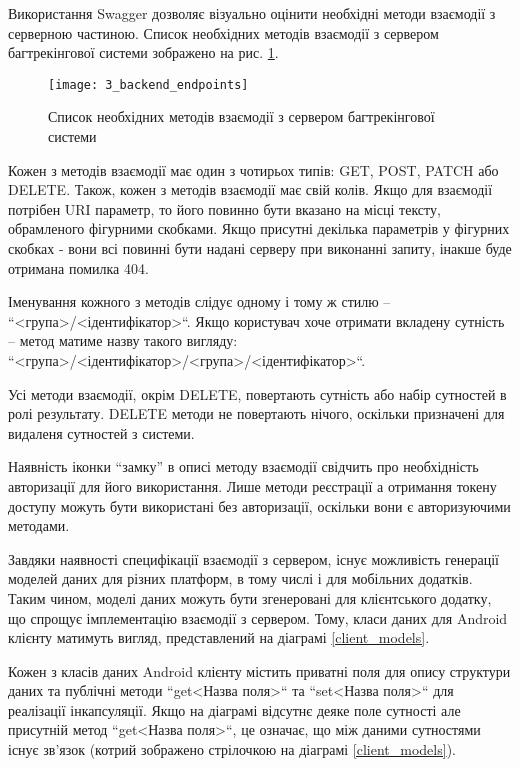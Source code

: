 \documentclass[../main.tex]{subfiles}
\begin{document}
		Використання Swagger дозволяє візуально оцінити необхідні методи взаємодії з серверною частиною. Список необхідних методів взаємодії з сервером багтрекінгової системи зображено на рис. \ref{available_rest_endpoints}.

		\begin{figure}[H]
			\centering
			\texttt{[image: 3\_backend\_endpoints]}
			\caption{Список необхідних методів взаємодії з сервером багтрекінгової системи}
			\label{available_rest_endpoints}
		\end{figure}

		Кожен з методів взаємодії має один з чотирьох типів: GET, POST, PATCH або DELETE. Також, кожен з методів взаємодії має свій колів. Якщо для взаємодії потрібен URI параметр, то його повинно бути вказано на місці тексту, обрамленого фігурними скобками. Якщо присутні декілька параметрів у фігурних скобках - вони всі повинні бути надані серверу при виконанні запиту, інакше буде отримана помилка 404.
		
		Іменування кожного з методів слідує одному і тому ж стилю -- ``<група>/<ідентифікатор>``. Якщо користувач хоче отримати вкладену сутність -- метод матиме назву такого вигляду: ``<група>/<ідентифікатор>/<група>/<ідентифікатор>``.
		
		Усі методи взаємодії, окрім DELETE, повертають сутність або набір сутностей в ролі результату. DELETE методи не повертають нічого, оскільки призначені для видаленя сутностей з системи.
		
		Наявність іконки \enquote{замку} в описі методу взаємодії свідчить про необхідність авторизації для його використання. Лише методи реєстрації а отримання токену доступу можуть бути використані без авторизації, оскільки вони є авторизуючими методами.
		
		Завдяки наявності специфікації взаємодії з сервером, існує можливість генерації моделей даних для різних платформ, в тому числі і для мобільних додатків. Таким чином, моделі даних можуть бути згенеровані для клієнтського додатку, що спрощує імплементацію взаємодії з сервером. Тому, класи даних для Android клієнту матимуть вигляд, представлений на діаграмі \ref{client_models}.
		
		Кожен з класів даних Android клієнту містить приватні поля для опису структури даних та публічні методи ``get<Назва поля>`` та ``set<Назва поля>`` для реалізації інкапсуляції. Якщо на діаграмі відсутнє деяке поле сутності але присутній метод ``get<Назва поля>``, це означає, що між даними сутностями існує зв'язок (котрий зображено стрілочкою на діаграмі \ref{client_models}).
		
\end{document}
